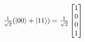 \documentclass[preview]{standalone}
\begin{document}
\begin{center}
$\frac{1}{\sqrt{2}}(\ket{00} + \ket{11}) = \frac{1}{\sqrt{2}}\begin{bmatrix} 1 \\ 0 \\ 0 \\ 1 \end{bmatrix}$
\end{center}
\end{document}
